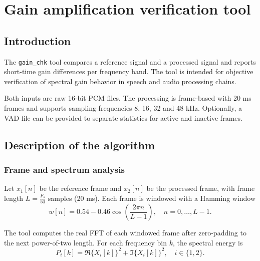 %
\chapter{Gain amplification verification tool}
\label{ch:gain_chk}

\section{Introduction}
\label{sec:gain_chk-intro}

The \texttt{gain\_chk} tool compares a reference signal and a processed
signal and reports short-time gain differences per frequency band. The
tool is intended for objective verification of spectral gain behavior in
speech and audio processing chains.

Both inputs are raw 16-bit PCM files. The processing is frame-based with
20 ms frames and supports sampling frequencies 8, 16, 32 and 48 kHz.
Optionally, a VAD file can be provided to separate statistics for active
and inactive frames.

\section{Description of the algorithm}
\label{sec:gain_chk-algorithm}

\subsection{Frame and spectrum analysis}

Let $x_1[n]$ be the reference frame and $x_2[n]$ be the processed frame,
with frame length $L=\frac{F_s}{50}$ samples (20 ms). Each frame is
windowed with a Hamming window
\begin{equation}
w[n] = 0.54 - 0.46\cos\left(\frac{2\pi n}{L-1}\right), \quad n=0,\ldots,L-1.
\end{equation}

The tool computes the real FFT of each windowed frame after zero-padding
to the next power-of-two length. For each frequency bin $k$, the spectral
energy is
\begin{equation}
P_i[k] = \Re\{X_i[k]\}^2 + \Im\{X_i[k]\}^2, \quad i \in \{1,2\}.
\end{equation}


